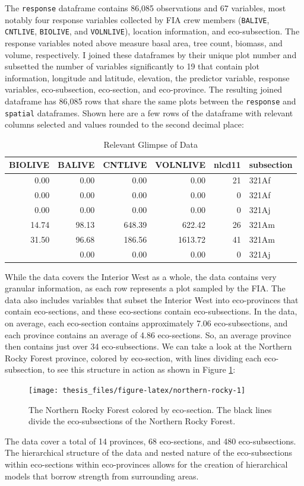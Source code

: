 \documentclass[12pt,twoside]{reedthesis}
\begin{document}
The \texttt{response} dataframe contains 86,085 observations and 67 variables, most notably four response variables collected by FIA crew members (\texttt{BALIVE}, \texttt{CNTLIVE}, \texttt{BIOLIVE}, and \texttt{VOLNLIVE}), location information, and eco-subsection. The response variables noted above measure basal area, tree count, biomass, and volume, respectively. I joined these dataframes by their unique plot number and subsetted the number of variables significantly to 19 that contain plot information, longitude and latitude, elevation, the predictor variable, response variables, eco-subsection, eco-section, and eco-province. The resulting joined dataframe has 86,085 rows that share the same plots between the \texttt{response} and \texttt{spatial} dataframes. Shown here are a few rows of the dataframe with relevant columns selected and values rounded to the second decimal place:
\begin{longtable}[t]{rrrrrl}
\caption[Relevant Glimpse of Data]{\label{tab:unnamed-chunk-3}Relevant Glimpse of Data}\\
\toprule
BIOLIVE & BALIVE & CNTLIVE & VOLNLIVE & nlcd11 & subsection\\
\midrule
0.00 & 0.00 & 0.00 & 0.00 & 21 & 321Af\\
0.00 & 0.00 & 0.00 & 0.00 & 0 & 321Af\\
0.00 & 0.00 & 0.00 & 0.00 & 0 & 321Aj\\
14.74 & 98.13 & 648.39 & 622.42 & 26 & 321Am\\
31.50 & 96.68 & 186.56 & 1613.72 & 41 & 321Am\\
\addlinespace
0.00 & 0.00 & 0.00 & 0.00 & 0 & 321Aj\\
\bottomrule
\end{longtable}
While the data covers the Interior West as a whole, the data contains very granular information, as each row represents a plot sampled by the FIA. The data also includes variables that subset the Interior West into eco-provinces that contain eco-sections, and these eco-sections contain eco-subsections. In the data, on average, each eco-section contains approximately 7.06 eco-subsections, and each province contains an average of 4.86 eco-sections. So, an average province then contains just over 34 eco-subsections. We can take a look at the Northern Rocky Forest province, colored by eco-section, with lines dividing each eco-subsection, to see this structure in action as shown in Figure \ref{fig:northern-rocky}:
\begin{figure}

{\centering \texttt{[image: thesis\_files/figure-latex/northern-rocky-1]} 

}

\caption[The Northern Rocky Forest colored by eco-section]{The Northern Rocky Forest colored by eco-section. The black lines divide the eco-subsections of the Northern Rocky Forest.}\label{fig:northern-rocky}
\end{figure}
The data cover a total of 14 provinces, 68 eco-sections, and 480 eco-subsections. The hierarchical structure of the data and nested nature of the eco-subsections within eco-sections within eco-provinces allows for the creation of hierarchical models that borrow strength from surrounding areas.
\end{document}
